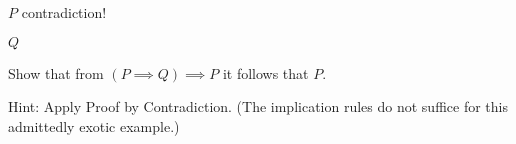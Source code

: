 \documentclass{report}
\begin{document}
\begin{Answer} [number=7.2]
  \begin{structured_derivation}
    \begin{nested_derivation}
      \begin{nested_derivation}
        \begin{nested_derivation}
            {$P$}
          contradiction!
        \end{nested_derivation}
      \end{nested_derivation}
    \end{nested_derivation}
    
    \begin{nested_derivation}
      \begin{nested_derivation}
        \begin{nested_derivation}
            {$Q$}
        \end{nested_derivation}
      \end{nested_derivation}
    \end{nested_derivation}
  \end{structured_derivation}
\end{Answer}



\begin{Exercise} [number=9, difficulty=1]
  Show that from $(P \implies Q) \implies P$ it follows that $P$.
  
  \ExeText Hint: Apply Proof by Contradiction. (The implication rules do not suffice for this admittedly exotic example.)
\end{Exercise}
\end{document}
